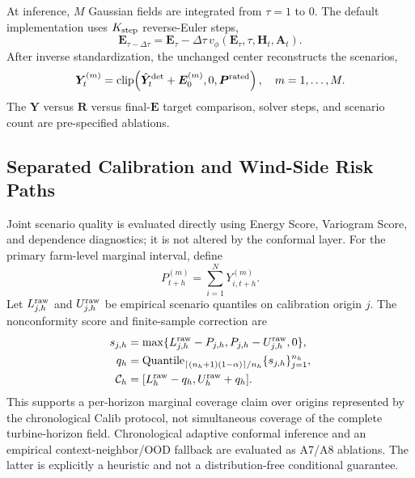 \documentclass[journal]{IEEEtran}
\begin{document}
At inference, $M$ Gaussian fields are integrated from $\tau=1$ to $0$. The default implementation uses $K_{\rm step}$ reverse-Euler steps,
\begin{equation}
\bm E_{\tau-\Delta\tau}=\bm E_\tau-
\Delta\tau\,v_\phi(\bm E_\tau,\tau,\bm H_t,\bm A_t).
\label{eq:reverse_ode}
\end{equation}
After inverse standardization, the unchanged center reconstructs the scenarios,
\begin{equation}
\bm Y_t^{(m)}=\operatorname{clip}\!\left(
\hat{\bm Y}^{\rm det}_t+\bm E_0^{(m)},0,\bm P^{\rm rated}
\right),\quad m=1,\ldots,M.
\label{eq:scenarios}
\end{equation}
The $\bm Y$ versus $\bm R$ versus final-$\bm E$ target comparison, solver steps, and scenario count are pre-specified ablations.

\subsection{Separated Calibration and Wind-Side Risk Paths}

Joint scenario quality is evaluated directly using Energy Score, Variogram Score, and dependence diagnostics; it is not altered by the conformal layer. For the primary farm-level marginal interval, define
\begin{equation}
P^{(m)}_{t+h}=\sum_{i=1}^{N}Y^{(m)}_{i,t+h}.
\label{eq:farm_scenario}
\end{equation}
Let $L^{\rm raw}_{j,h}$ and $U^{\rm raw}_{j,h}$ be empirical scenario quantiles on calibration origin $j$. The nonconformity score and finite-sample correction are
\begin{align}
s_{j,h}&=\max\{L^{\rm raw}_{j,h}-P_{j,h},
P_{j,h}-U^{\rm raw}_{j,h},0\},\nonumber\\
q_h&=\operatorname{Quantile}_{\lceil(n_h+1)(1-\alpha)\rceil/n_h}
\{s_{j,h}\}_{j=1}^{n_h},\nonumber\\
\mathcal C_h&=[L^{\rm raw}_h-q_h,U^{\rm raw}_h+q_h].
\label{eq:split_conformal}
\end{align}
This supports a per-horizon marginal coverage claim over origins represented by the chronological Calib protocol, not simultaneous coverage of the complete turbine-horizon field. Chronological adaptive conformal inference \cite{gibbs2021aci} and an empirical context-neighbor/OOD fallback are evaluated as A7/A8 ablations. The latter is explicitly a heuristic and not a distribution-free conditional guarantee.
\end{document}
